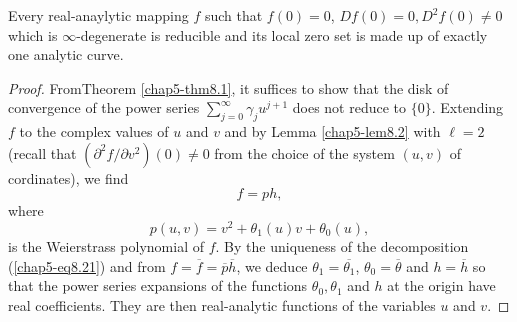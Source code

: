 \begin{theorem}\label{chap5-thm8.2}
Every real-anaylytic mapping $f$ such that $f(0) = 0$, $Df(0) = 0,
D^{2}f(0) \neq 0$ which is $\infty$-degenerate is reducible and its
local zero set is made up of exactly one analytic curve.
\end{theorem}

\begin{proof}
From\pageoriginale Theorem \ref{chap5-thm8.1}, it suffices to show
that the disk of 
convergence of the power series $\sum\limits_{j=0}^{\infty} \gamma_{j}
u^{j+1}$ does not reduce to $\{0\}$. Extending $f$ to the complex values
of $u$ and $v$ and by Lemma \ref{chap5-lem8.2} with $\ell = 2$ (recall
that $(\partial^{2} f / \partial v^{2})(0) \neq 0$ from the choice of
the system $(u, v)$ of cordinates), we find
\begin{equation*}
f = ph,\tag{8.21}\label{chap5-eq8.21}
\end{equation*}
where
$$
p(u, v) = v^{2} + \theta_{1}(u)v + \theta_{0}(u),
$$
is the Weierstrass polynomial of $f$. By the uniqueness of the
decomposition (\ref{chap5-eq8.21}) and from $f = \overline{f} =
\overline{p} \overline{h}$, we deduce $\theta_{1} =
\overline{\theta_{1}}$, $\theta_{0}  = \overline{\theta}$ and $h =
\overline{h}$ so that the power series expansions of the functions
$\theta_{0}, \theta_{1}$ and $h$ at the origin have real
coefficients. They are then real-analytic functions of the variables $u$
and $v$.


\end{proof}
